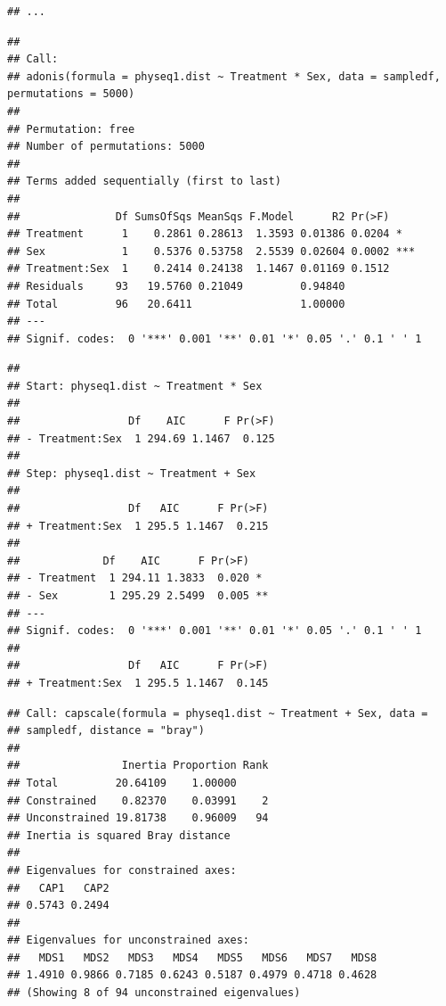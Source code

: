 \documentclass[]{article}
\begin{document}
\begin{verbatim}
## ...
\end{verbatim}

\begin{verbatim}
## 
## Call:
## adonis(formula = physeq1.dist ~ Treatment * Sex, data = sampledf,      permutations = 5000) 
## 
## Permutation: free
## Number of permutations: 5000
## 
## Terms added sequentially (first to last)
## 
##               Df SumsOfSqs MeanSqs F.Model      R2 Pr(>F)    
## Treatment      1    0.2861 0.28613  1.3593 0.01386 0.0204 *  
## Sex            1    0.5376 0.53758  2.5539 0.02604 0.0002 ***
## Treatment:Sex  1    0.2414 0.24138  1.1467 0.01169 0.1512    
## Residuals     93   19.5760 0.21049         0.94840           
## Total         96   20.6411                 1.00000           
## ---
## Signif. codes:  0 '***' 0.001 '**' 0.01 '*' 0.05 '.' 0.1 ' ' 1
\end{verbatim}

\begin{verbatim}
## 
## Start: physeq1.dist ~ Treatment * Sex 
## 
##                 Df    AIC      F Pr(>F)
## - Treatment:Sex  1 294.69 1.1467  0.125
## 
## Step: physeq1.dist ~ Treatment + Sex 
## 
##                 Df   AIC      F Pr(>F)
## + Treatment:Sex  1 295.5 1.1467  0.215
## 
##             Df    AIC      F Pr(>F)   
## - Treatment  1 294.11 1.3833  0.020 * 
## - Sex        1 295.29 2.5499  0.005 **
## ---
## Signif. codes:  0 '***' 0.001 '**' 0.01 '*' 0.05 '.' 0.1 ' ' 1
## 
##                 Df   AIC      F Pr(>F)
## + Treatment:Sex  1 295.5 1.1467  0.145
\end{verbatim}

\begin{verbatim}
## Call: capscale(formula = physeq1.dist ~ Treatment + Sex, data =
## sampledf, distance = "bray")
## 
##                Inertia Proportion Rank
## Total         20.64109    1.00000     
## Constrained    0.82370    0.03991    2
## Unconstrained 19.81738    0.96009   94
## Inertia is squared Bray distance 
## 
## Eigenvalues for constrained axes:
##   CAP1   CAP2 
## 0.5743 0.2494 
## 
## Eigenvalues for unconstrained axes:
##   MDS1   MDS2   MDS3   MDS4   MDS5   MDS6   MDS7   MDS8 
## 1.4910 0.9866 0.7185 0.6243 0.5187 0.4979 0.4718 0.4628 
## (Showing 8 of 94 unconstrained eigenvalues)
\end{verbatim}
\end{document}
